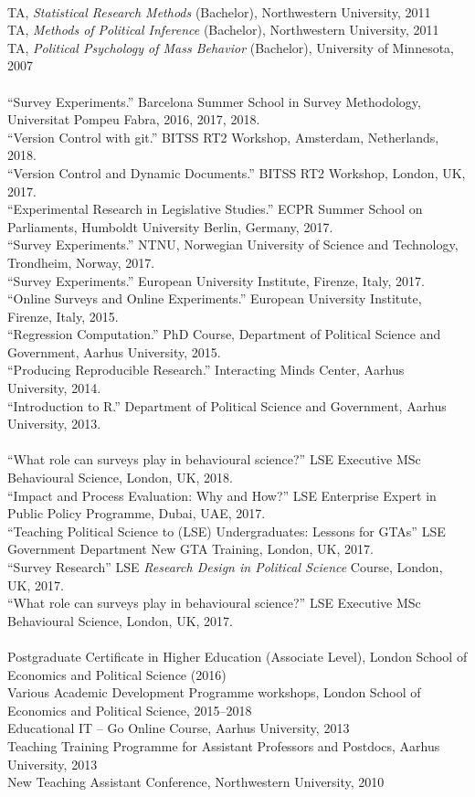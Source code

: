 \documentclass[12pt]{article}
\newcommand{\topic}[1]{\pagebreak[3]\indent {\color{lg}{\footnotesize #1 }}\\}
\newcommand{\entry}[1]{\indent {\color{lg}\guillemotright}\hspace{2pt}#1\vspace{.25em}\\}
\begin{document}
\topic{Class Teaching: Northwestern University}
	\entry{TA, \textit{Statistical Research Methods} (Bachelor), Northwestern University, 2011} %
	\entry{TA, \textit{Methods of Political Inference} (Bachelor), Northwestern University, 2011} %
	\entry{TA, \textit{Political Psychology of Mass Behavior} (Bachelor), University of Minnesota, 2007} %

\topic{Short Courses}
	\entry{``Survey Experiments.'' Barcelona Summer School in Survey Methodology, Universitat Pompeu Fabra, 2016, 2017, 2018.}
	\entry{``Version Control with git.'' BITSS RT2 Workshop, Amsterdam, Netherlands, 2018.}
    \entry{``Version Control and Dynamic Documents.'' BITSS RT2 Workshop, London, UK, 2017.}
    \entry{``Experimental Research in Legislative Studies.'' ECPR Summer School on Parliaments, Humboldt University Berlin, Germany, 2017.}
    \entry{``Survey Experiments.'' NTNU, Norwegian University of Science and Technology, Trondheim, Norway, 2017.}
	\entry{``Survey Experiments.'' European University Institute, Firenze, Italy, 2017.}
	\entry{``Online Surveys and Online Experiments.'' European University Institute, Firenze, Italy, 2015.}
	\entry{``Regression Computation.'' PhD Course, Department of Political Science and Government, Aarhus University, 2015.}
	\entry{``Producing Reproducible Research.'' Interacting Minds Center, Aarhus University, 2014.}
	\entry{``Introduction to R.'' Department of Political Science and Government, Aarhus University, 2013.}

\topic{Guest Lectures}
    \entry{``What role can surveys play in behavioural science?'' LSE Executive MSc Behavioural Science, London, UK, 2018.}
    \entry{``Impact and Process Evaluation: Why and How?'' LSE Enterprise Expert in Public Policy Programme, Dubai, UAE, 2017.}
    \entry{``Teaching Political Science to (LSE) Undergraduates: Lessons for GTAs'' LSE Government Department New GTA Training, London, UK, 2017.}
    \entry{``Survey Research'' LSE \textit{Research Design in Political Science} Course, London, UK, 2017.}
    \entry{``What role can surveys play in behavioural science?'' LSE Executive MSc Behavioural Science, London, UK, 2017.}
    
\topic{Pedagogical Training}
	\entry{Postgraduate Certificate in Higher Education (Associate Level), London School of Economics and Political Science (2016)}
	\entry{Various Academic Development Programme workshops, London School of Economics and Political Science, 2015--2018}
	\entry{Educational IT -- Go Online Course, Aarhus University, 2013}
	\entry{Teaching Training Programme for Assistant Professors and Postdocs, Aarhus University, 2013}
	\entry{New Teaching Assistant Conference, Northwestern University, 2010}
\end{document}
